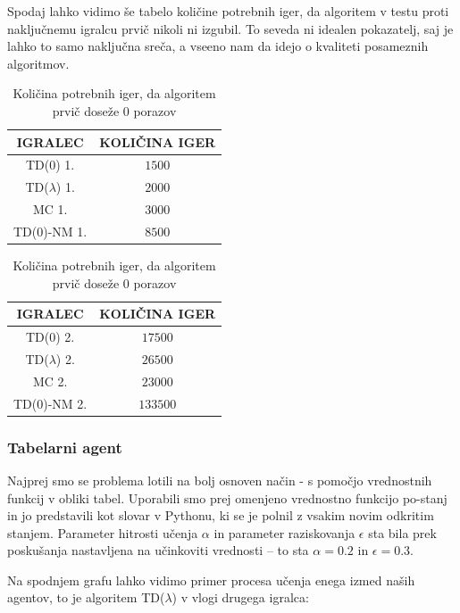 \documentclass[12pt,a4paper]{amsart}
\theoremstyle{definition} %
\theoremstyle{plain} %
\begin{document}
Spodaj lahko vidimo še tabelo količine potrebnih iger, da algoritem v testu proti naključnemu igralcu 
prvič nikoli ni izgubil. To seveda ni idealen pokazatelj, saj je lahko to samo naključna sreča, a vseeno
nam da idejo o kvaliteti posameznih algoritmov. 

\begin{center}
    \begin{table}[H]
        \begin{tabular}{| c | c |}
            \hline
            IGRALEC & KOLIČINA IGER\\
            \hline
            TD($0$) 1. & $1500$\\
            TD($\lambda$) 1. & $2000$\\
            MC 1. & $3000$\\
            TD($0$)-NM 1. & $8500$\\
            \hline
    \end{tabular}
    \quad
    \begin{tabular}{| c | c |}
        \hline
        IGRALEC & KOLIČINA IGER\\
        \hline
        TD($0$) 2. & $17500$\\
        TD($\lambda$) 2. & $26500$\\
        MC 2. & $23000$\\
        TD($0$)-NM 2. & $133500$\\
        \hline
\end{tabular}
    \caption{Količina potrebnih iger, da algoritem prvič doseže $0$ porazov}
    \end{table}
    \end{center}

\subsubsection{Tabelarni agent}
Najprej smo se problema lotili na bolj osnoven način - s pomočjo vrednostnih funkcij v obliki tabel. 
Uporabili smo prej omenjeno vrednostno funkcijo po-stanj in jo predstavili kot slovar v Pythonu, ki 
se je polnil z vsakim novim odkritim stanjem. Parameter hitrosti učenja $\alpha$ in parameter 
raziskovanja $\epsilon$ sta bila prek poskušanja nastavljena na učinkoviti vrednosti -- to sta 
$\alpha = 0.2$ in $\epsilon = 0.3$.

Na spodnjem grafu lahko vidimo primer procesa učenja enega izmed naših agentov, to je algoritem 
TD($\lambda$) v vlogi drugega igralca:
\end{document}
